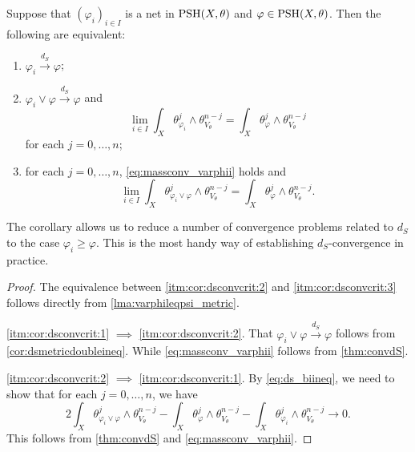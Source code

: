 \begin{corollary}\label{cor:dsconvcrit}
    Suppose that $(\varphi_i)_{i\in I}$ is a net in $\mathrm{PSH}(X,\theta)$ and $\varphi\in \mathrm{PSH}(X,\theta)$. Then the following are equivalent:
    \begin{enumerate}
        \item\label{itm:cor:dsconvcrit:1} $\varphi_i\xrightarrow{d_S}\varphi$;
        \item\label{itm:cor:dsconvcrit:2} $\varphi_i\lor \varphi\xrightarrow{d_S}\varphi$ and
        \begin{equation}\label{eq:massconv_varphii}
        \lim_{i\in I}\int_X \theta_{\varphi_i}^j\wedge \theta_{V_{\theta}}^{n-j}=\int_X \theta_{\varphi}^j\wedge \theta_{V_{\theta}}^{n-j}
        \end{equation}
        for each $j=0,\ldots,n$;
        \item\label{itm:cor:dsconvcrit:3} for each $j=0,\ldots,n$, \eqref{eq:massconv_varphii} holds and
        \begin{equation}\label{eq:massconv_varphii2}
        \lim_{i\in I}\int_X \theta_{\varphi_i\lor \varphi}^j\wedge \theta_{V_{\theta}}^{n-j}=\int_X \theta_{\varphi}^j\wedge \theta_{V_{\theta}}^{n-j}.
        \end{equation}
    \end{enumerate}
\end{corollary}
The corollary allows us to reduce a number of convergence problems related to $d_S$ to the case $\varphi_i\geq \varphi$.
This is the most handy way of establishing $d_S$-convergence in practice.
\begin{proof}
    The equivalence between \ref{itm:cor:dsconvcrit:2} and \ref{itm:cor:dsconvcrit:3} follows directly from \cref{lma:varphileqpsi_metric}.

    \ref{itm:cor:dsconvcrit:1} $\implies$ \ref{itm:cor:dsconvcrit:2}. That $\varphi_i\lor \varphi\xrightarrow{d_S}\varphi$ follows from \cref{cor:dsmetricdoubleineq}. While \eqref{eq:massconv_varphii} follows from \cref{thm:convdS}.

    \ref{itm:cor:dsconvcrit:2} $\implies$ \ref{itm:cor:dsconvcrit:1}. By \eqref{eq:ds_biineq}, we need to show that for each $j=0,\ldots,n$, we have
    \[
    2\int_X \theta_{\varphi_i\lor \varphi}^j\wedge \theta_{V_{\theta}}^{n-j}-\int_X \theta_{\varphi}^j\wedge \theta_{V_{\theta}}^{n-j}-\int_X \theta_{\varphi_i}^j\wedge \theta_{V_{\theta}}^{n-j}\to 0.
    \]
    This follows from \cref{thm:convdS} and \eqref{eq:massconv_varphii}.
\end{proof}

